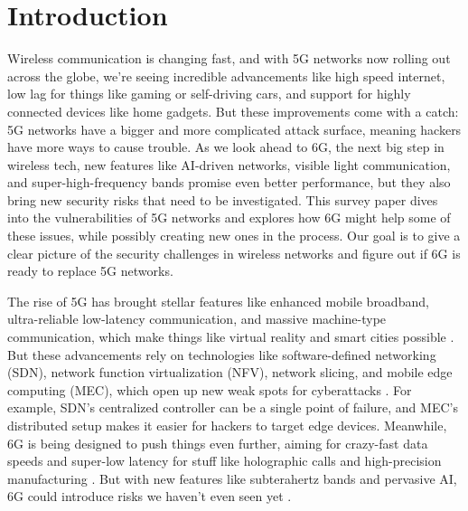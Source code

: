 \documentclass[acmtog]{acmart}
\begin{document}

\maketitle

\section{Introduction}

Wireless communication is changing fast, and with 5G networks now rolling out across the globe, we're seeing incredible advancements like high speed internet, low lag for things like gaming or self-driving cars, and support for highly connected devices like home gadgets. But these improvements come with a catch: 5G networks have a bigger and more complicated attack surface, meaning hackers have more ways to cause trouble. As we look ahead to 6G, the next big step in wireless tech, new features like AI-driven networks, visible light communication, and super-high-frequency bands promise even better performance, but they also bring new security risks that need to be investigated. This survey paper dives into the vulnerabilities of 5G networks and explores how 6G might help some of these issues, while possibly creating new ones in the process. Our goal is to give a clear picture of the security challenges in wireless networks and figure out if 6G is ready to replace 5G networks.

The rise of 5G has brought stellar features like enhanced mobile broadband, ultra-reliable low-latency communication, and massive machine-type communication, which make things like virtual reality and smart cities possible \cite{ref6}. But these advancements rely on technologies like software-defined networking (SDN), network function virtualization (NFV), network slicing, and mobile edge computing (MEC), which open up new weak spots for cyberattacks \cite{ref3}. For example, SDN’s centralized controller can be a single point of failure, and MEC’s distributed setup makes it easier for hackers to target edge devices. Meanwhile, 6G is being designed to push things even further, aiming for crazy-fast data speeds and super-low latency for stuff like holographic calls and high-precision manufacturing \cite{ref4}. But with new features like subterahertz bands and pervasive AI, 6G could introduce risks we haven’t even seen yet \cite{ref4_1}.
\end{document}
